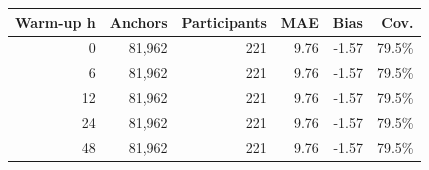 \begin{tabular}{rrrrrr}
\toprule
Warm-up h & Anchors & Participants & MAE & Bias & Cov. \\
\midrule
0 & 81,962 & 221 & 9.76 & -1.57 & 79.5\% \\
6 & 81,962 & 221 & 9.76 & -1.57 & 79.5\% \\
12 & 81,962 & 221 & 9.76 & -1.57 & 79.5\% \\
24 & 81,962 & 221 & 9.76 & -1.57 & 79.5\% \\
48 & 81,962 & 221 & 9.76 & -1.57 & 79.5\% \\
\bottomrule
\end{tabular}
